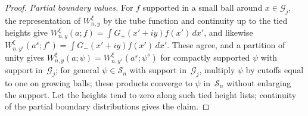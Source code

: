 \begin{proof}
\emph{Partial boundary values.} For $f$ supported in a small ball around $x\in\mathcal G_j$, the representation of $W^\xi_{n,y}$ by the tube function and continuity up to the tied heights give $W^\xi_{n,y}(a;f)=\int G_+(x'+iy)f(x')\,dx'$, and likewise $W^\xi_{n,y^s}(a^s;f^s)=\int G_-(x'+iy)f(x')\,dx'$. These agree, and a partition of unity gives $W^\xi_{n,y}(a;\psi)=W^\xi_{n,y^s}(a^s;\psi^s)$ for compactly supported $\psi$ with support in~$\mathcal G_j$; for general $\psi\in\mathcal S_n$ with support in~$\mathcal G_j$, multiply $\psi$ by cutoffs equal to one on growing balls; these products converge to $\psi$ in~$\mathcal S_n$ without enlarging the support. Let the heights tend to zero along such tied height lists; continuity of the partial boundary distributions gives the claim.
\end{proof}

